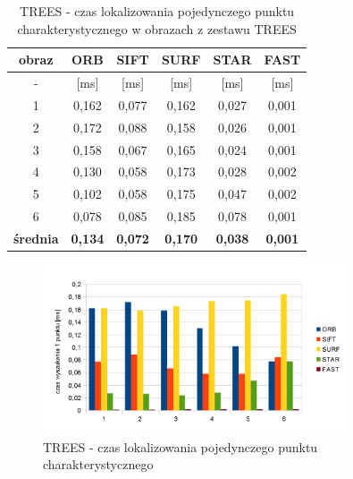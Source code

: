 \begin{table}[htbp]
  \centering
  \caption{TREES - czas lokalizowania pojedynczego punktu charakterystycznego w obrazach z zestawu TREES}
    \begin{tabular}{|c|c|c|c|c|c|}
    \hline
    obraz & \textbf{ORB} & \textbf{SIFT} & \textbf{SURF} & \textbf{STAR} & \textbf{FAST} \\
    \hline
    -  & [ms] & [ms] & [ms] & [ms] & [ms] \\\hline
    1 & 0,162 & 0,077 & 0,162 & 0,027 & 0,001 \\
    2 & 0,172 & 0,088 & 0,158 & 0,026 & 0,001 \\
    3 & 0,158 & 0,067 & 0,165 & 0,024 & 0,001 \\
    4 & 0,130 & 0,058 & 0,173 & 0,028 & 0,002 \\
    5 & 0,102 & 0,058 & 0,175 & 0,047 & 0,002 \\
    6 & 0,078 & 0,085 & 0,185 & 0,078 & 0,001 \\\hline
    \textbf{średnia} & \textbf{0,134} & \textbf{0,072} & \textbf{0,170} & \textbf{0,038} & \textbf{0,001} \\
   \hline
    \end{tabular}%
  \label{tab:trees_f2}%
\end{table}%


\begin{figure}
\centering
\includegraphics[width=0.8\textwidth]{pict/mikolajczyk/trees/f2.png}
\caption{TREES - czas lokalizowania pojedynczego punktu charakterystycznego}
\label{fig:trees_f2}
\end{figure}

